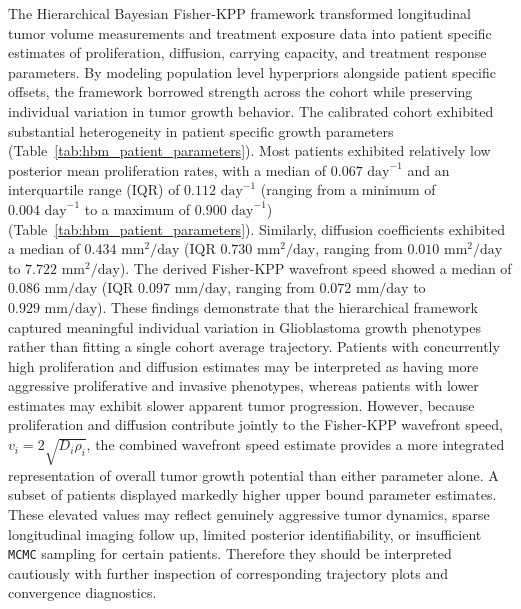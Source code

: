 The Hierarchical Bayesian Fisher-KPP framework transformed longitudinal tumor volume measurements and treatment exposure data into patient specific estimates of proliferation, diffusion, carrying capacity, and treatment response parameters. By modeling population level hyperpriors alongside patient specific offsets, the framework borrowed strength across the cohort while preserving individual variation in tumor growth behavior. The calibrated cohort exhibited substantial heterogeneity in patient specific growth parameters (Table~\ref{tab:hbm_patient_parameters}). Most patients exhibited relatively low posterior mean proliferation rates, with a median of $0.067\text{ day}^{-1}$ and an interquartile range (IQR) of $0.112\text{ day}^{-1}$ (ranging from a minimum of $0.004\text{ day}^{-1}$ to a maximum of $0.900\text{ day}^{-1}$) (Table~\ref{tab:hbm_patient_parameters}). Similarly, diffusion coefficients exhibited a median of $0.434\text{ mm}^2/\text{day}$ (IQR $0.730\text{ mm}^2/\text{day}$, ranging from $0.010\text{ mm}^2/\text{day}$ to $7.722\text{ mm}^2/\text{day}$). The derived Fisher-KPP wavefront speed showed a median of $0.086\text{ mm/day}$ (IQR $0.097\text{ mm/day}$, ranging from $0.072\text{ mm/day}$ to $0.929\text{ mm/day}$). These findings demonstrate that the hierarchical framework captured meaningful individual variation in Glioblastoma growth phenotypes rather than fitting a single cohort average trajectory. Patients with concurrently high proliferation and diffusion estimates may be interpreted as having more aggressive proliferative and invasive phenotypes, whereas patients with lower estimates may exhibit slower apparent tumor progression. However, because proliferation and diffusion contribute jointly to the Fisher-KPP wavefront speed, $v_i = 2\sqrt{D_i\rho_i}$, the combined wavefront speed estimate provides a more integrated representation of overall tumor growth potential than either parameter alone. A subset of patients displayed markedly higher upper bound parameter estimates. These elevated values may reflect genuinely aggressive tumor dynamics, sparse longitudinal imaging follow up, limited posterior identifiability, or insufficient \texttt{MCMC} sampling for certain patients. Therefore they should be interpreted cautiously with further inspection of corresponding trajectory plots and convergence diagnostics.

